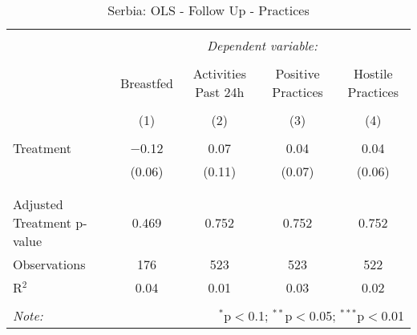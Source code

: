 
\begin{table}[!htbp] \centering 
  \caption{Serbia: OLS - Follow Up - Practices} 
  \label{tbl:Serbia: OLS - Follow Up - Practices} 
\begin{tabular}{@{\extracolsep{5pt}}lcccc} 
\\[-1.8ex]\hline 
\hline \\[-1.8ex] 
 & \multicolumn{4}{c}{\textit{Dependent variable:}} \\ 
\cline{2-5} 
\\[-1.8ex] & Breastfed & Activities Past 24h & Positive Practices & Hostile Practices \\ 
\\[-1.8ex] & (1) & (2) & (3) & (4)\\ 
\hline \\[-1.8ex] 
 Treatment & $-$0.12 & 0.07 & 0.04 & 0.04 \\ 
  & (0.06) & (0.11) & (0.07) & (0.06) \\ 
  & & & & \\ 
\hline \\[-1.8ex] 
Adjusted Treatment p-value & 0.469 & 0.752 & 0.752 & 0.752 \\ 
Observations & 176 & 523 & 523 & 522 \\ 
R$^{2}$ & 0.04 & 0.01 & 0.03 & 0.02 \\ 
\hline 
\hline \\[-1.8ex] 
\textit{Note:}  & \multicolumn{4}{r}{$^{*}$p$<$0.1; $^{**}$p$<$0.05; $^{***}$p$<$0.01} \\ 
\end{tabular} 
\end{table} 
